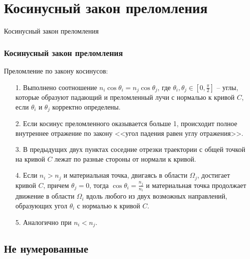 \section{Косинусный закон преломления}
\begin{frame}
    \begin{center}
        \Huge
        Косинусный закон преломления
    \end{center}
\end{frame}

\begin{frame}\frametitle{Косинусный закон преломления}


\qq Преломление по закону косинусов: 
\begin{itemize}
\item[1.] Выполнено соотношение $n_i \cos \theta_i = n_j \cos \theta_j $, где $\theta_i, \theta_j \in [0,\frac{\pi}{2} ]$ -- углы, которые образуют падающий и преломленный лучи с нормалью к кривой $C$, если $\theta_i$ и $\theta_j$ корректно определены.
\item[2.] Если косинус преломленного оказывается больше 1, происходит полное внутреннее отражение по закону <<угол падения равен углу отражения>>.
\item[3.] В предыдущих двух пунктах  соседние отрезки траектории с общей точкой на кривой $C$ лежат по разные стороны от нормали к кривой.
\item[4.] Если $n_i > n_j$ и материальная точка, двигаясь в области $\Omega_j$, достигает кривой $C$, причем $\theta_j = 0$, тогда $\cos \theta_i = \frac{n_j}{n_i}$ и материальная точка продолжает движение в области $\Omega_i$ вдоль любого из двух возможных направлений, образующих угол $\theta_i$ с нормалью к кривой $C$.
\item[5.] Аналогично при $n_i < n_j$.
\end{itemize}
\end{frame}

\subsection{Не нумерованные}



